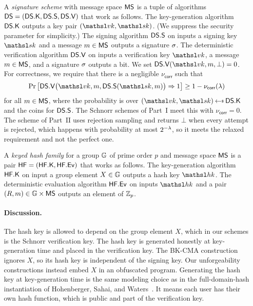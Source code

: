 A \emph{signature scheme} with message space $\mathsf{MS}$ is a tuple of algorithms $\mathsf{DS} = (\mathsf{DS}.\mathsf{K}, \mathsf{DS}.\mathsf{S}, \mathsf{DS}.\mathsf{V})$ that work as follows. The key-generation algorithm $\mathsf{DS}.\mathsf{K}$ outputs a key pair $(\vkey,\skey)$. (We suppress the security parameter for simplicity.) The signing algorithm $\mathsf{DS}.\mathsf{S}$ on inputs a signing key $\skey$ and a message $m \in \mathsf{MS}$ outputs a signature $\sigma$. The deterministic verification algorithm $\mathsf{DS}.\mathsf{V}$ on inputs a verification key $\vkey$, a message $m \in \mathsf{MS}$, and a signature $\sigma$ outputs a bit. We set $\SigVf(\vkey,m,\bot) = 0$. For correctness, we require that there is a negligible $\nu_{\mathsf{corr}}$ such that
$$
 \Pr\big[ \SigVf\big(\vkey, m, \SigSign(\skey, m)\big) \Rightarrow 1 \big]
 \ge 1 - \nu_{\mathsf{corr}}(\secp)
$$
for all $m \in \mathsf{MS}$, where the probability is over $(\vkey,\skey) \getsr \SigKeys$ and the coins for $\mathsf{DS}.\mathsf{S}$. The Schnorr schemes of Part~I meet this with $\nu_{\mathsf{corr}} = 0$. The scheme of Part~II uses rejection sampling and returns $\bot$ when every attempt is rejected, which happens with probability at most $2^{-\lambda}$, so it meets the relaxed requirement and not the perfect one.

 A \emph{keyed hash family} for a group $\mathbb{G}$ of prime order $p$ and message space $\mathsf{MS}$ is a pair $\mathsf{HF} = (\mathsf{HF}.\mathsf{K}, \mathsf{HF}.\mathsf{Ev})$ that works as follows. The key-generation algorithm $\mathsf{HF}.\mathsf{K}$ on input a group element $X \in \mathbb{G}$ outputs a hash key $\hk$. The deterministic evaluation algorithm $\mathsf{HF}.\mathsf{Ev}$ on inputs $\hk$ and a pair $(R,m) \in \mathbb{G} \times \mathsf{MS}$ outputs an element of $\mathbb Z_p$.

\paragraph*{Discussion.} The hash key is allowed to depend on the group element $X$, which in our schemes is the Schnorr verification key. The hash key is generated honestly at key-generation time and placed in the verification key. The BK-CMA construction ignores $X$, so its hash key is independent of the signing key. Our unforgeability constructions instead embed $X$ in an obfuscated program. Generating the hash key at key-generation time is the same modeling choice as in the full-domain-hash instantiation of Hohenberger, Sahai, and Waters~\cite{EC:HohSahWat14}. It means each user has their own hash function, which is public and part of the verification key.

